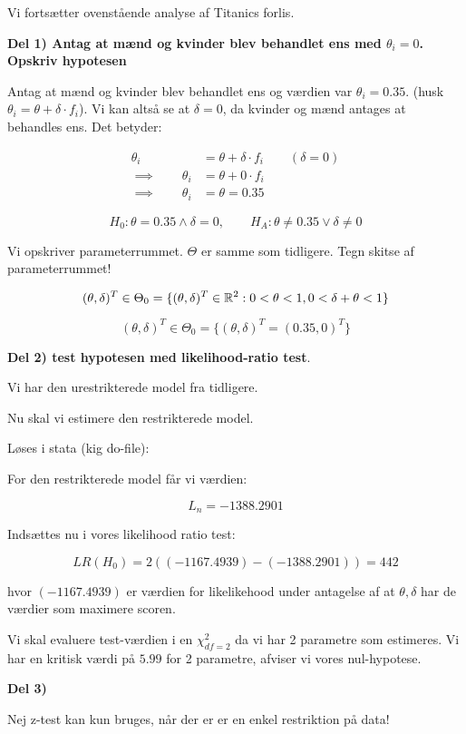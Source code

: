 Vi fortsætter ovenstående analyse af Titanics forlis.

\textbf{Del 1) Antag at mænd og kvinder blev behandlet ens med $\theta_i = 0$. Opskriv hypotesen}

Antag at mænd og kvinder blev behandlet ens og værdien var $\theta_i = 0.35$. (husk $\theta_i = \theta + \delta\cdot f_i$). Vi kan altså se at $\delta = 0$, da kvinder og mænd antages at behandles ens. Det betyder:

\begin{align}
    \theta_i &= \theta + \delta\cdot f_i  \qquad (\delta = 0 )\\
    \implies \qquad \theta_i &= \theta + 0 \cdot f_i \\ \implies \qquad
    \theta_i &= \theta = 0.35
\end{align}

\begin{equation}
    H_0 : \theta = 0.35 \land \delta = 0, \qquad H_A : \theta \neq 0.35 \lor \delta \neq 0
\end{equation}

Vi opskriver parameterrummet. $\Theta$ er samme som tidligere. Tegn skitse af parameterrummet!

\begin{equation}
    (\theta, \delta)^T \in \Theta_0 = \{(\theta, \delta)^T \in \mathbb{R}^2 : 0 < \theta < 1, 0 < \delta + \theta < 1\}
\end{equation}

\begin{equation}
    (\theta, \delta)^T \in \Theta_0 = \{(\theta, \delta)^T = (0.35, 0)^T \}
\end{equation}

\textbf{Del 2) test hypotesen med likelihood-ratio test}.

Vi har den urestrikterede model fra tidligere.

Nu skal vi estimere den restrikterede model.

Løses i stata (kig do-file):

For den restrikterede model får vi værdien:

\begin{equation}
    L_n = -1388.2901
\end{equation}

Indsættes nu i vores likelihood ratio test:

\begin{equation}
    LR(H_0) = 2((-1167.4939)  - (-1388.2901) ) = 442
\end{equation}

hvor $(-1167.4939)$ er værdien for likelikehood under antagelse af at $\theta, \delta$ har de værdier som maximere scoren.

Vi skal evaluere test-værdien i en $\chi^2_{df=2}$ da vi har 2 parametre som estimeres. Vi har en kritisk værdi på $5.99$ for 2 parametre, afviser vi vores nul-hypotese.

\textbf{Del 3)}

Nej z-test kan kun bruges, når der er er en enkel restriktion på data!


